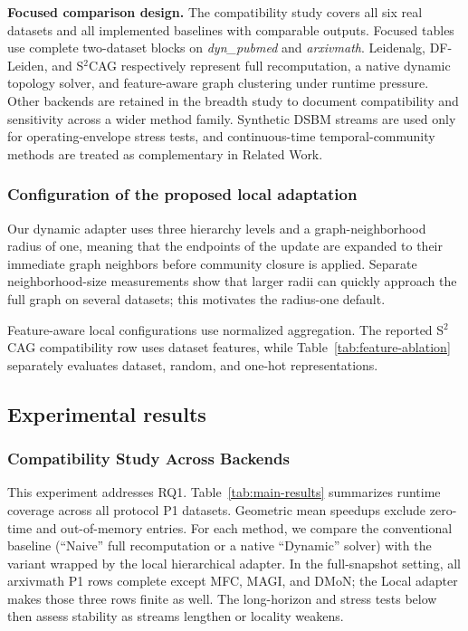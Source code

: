 \documentclass[conference]{IEEEtran}
\theoremstyle{definition}
\begin{document}
\textbf{Focused comparison design.}
The compatibility study covers all six real datasets and all implemented
baselines with comparable outputs. Focused tables use complete two-dataset
blocks on \textit{dyn\_pubmed} and \textit{arxivmath}. Leidenalg, DF-Leiden,
and S$^2$CAG respectively represent full recomputation, a native dynamic
topology solver, and feature-aware graph clustering under runtime pressure.
Other backends are retained in the breadth study to document compatibility and
sensitivity across a wider method family. Synthetic DSBM streams are used only
for operating-envelope stress tests, and continuous-time temporal-community
methods are treated as complementary in Related Work.

\subsubsection{Configuration of the proposed local adaptation}
Our dynamic adapter uses three hierarchy levels and a graph-neighborhood radius
of one, meaning that the endpoints of the update are expanded to their
immediate graph neighbors before community closure is applied. Separate
neighborhood-size measurements show that larger radii can quickly approach the
full graph on several datasets; this motivates the radius-one default.

Feature-aware local configurations use normalized aggregation. The reported
S$^2$CAG compatibility row uses dataset features, while
Table~\ref{tab:feature-ablation} separately evaluates dataset, random, and
one-hot representations.

\subsection{Experimental results}

\subsubsection{Compatibility Study Across Backends}

This experiment addresses RQ1.
Table~\ref{tab:main-results} summarizes runtime coverage across all protocol P1
datasets. Geometric mean speedups exclude zero-time and out-of-memory entries.
For each method, we compare the conventional baseline (``Naive'' full
recomputation or a native ``Dynamic'' solver) with the variant wrapped by the
local hierarchical adapter. In the full-snapshot setting, all arxivmath P1 rows
complete except MFC, MAGI, and DMoN; the Local adapter makes those three rows
finite as well. The long-horizon and stress tests below then assess stability
as streams lengthen or locality weakens.
\end{document}
